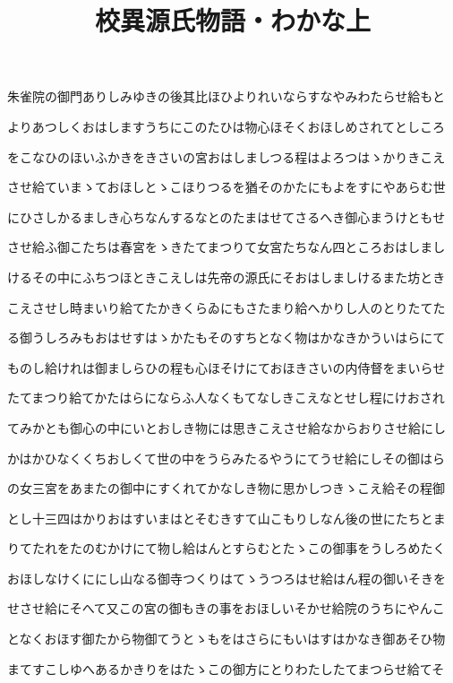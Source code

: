 \documentclass[a4paper,11pt,landscape]{ltjtarticle}
\title{校異源氏物語・わかな上}
\date{}
\begin{document}
\maketitle

朱雀院の御門ありしみゆきの後其比ほひよりれいならすなやみわたらせ給もと
\par\medskip
よりあつしくおはしますうちにこのたひは物心ほそくおほしめされてとしころ
\par\medskip
をこなひのほいふかきをきさいの宮おはしましつる程はよろつはゝかりきこえ
\par\medskip
させ給ていまゝておほしとゝこほりつるを猶そのかたにもよをすにやあらむ世
\par\medskip
にひさしかるましき心ちなんするなとのたまはせてさるへき御心まうけともせ
\par\medskip
させ給ふ御こたちは春宮をゝきたてまつりて女宮たちなん四ところおはしまし
\par\medskip
けるその中にふちつほときこえしは先帝の源氏にそおはしましけるまた坊とき
\par\medskip
こえさせし時まいり給てたかきくらゐにもさたまり給へかりし人のとりたてた
\par\medskip
る御うしろみもおはせすはゝかたもそのすちとなく物はかなきかういはらにて
\par\medskip
ものし給けれは御ましらひの程も心ほそけにておほきさいの内侍督をまいらせ
\par\medskip
たてまつり給てかたはらにならふ人なくもてなしきこえなとせし程にけおされ
\par\medskip
てみかとも御心の中にいとおしき物には思きこえさせ給なからおりさせ給にし
\par\medskip
かはかひなくくちおしくて世の中をうらみたるやうにてうせ給にしその御はら
\par\medskip
の女三宮をあまたの御中にすくれてかなしき物に思かしつきゝこえ給その程御
\par\medskip
とし十三四はかりおはすいまはとそむきすて山こもりしなん後の世にたちとま
\par\medskip
りてたれをたのむかけにて物し給はんとすらむとたゝこの御事をうしろめたく
\par\medskip
おほしなけくににし山なる御寺つくりはてゝうつろはせ給はん程の御いそきを
\par\medskip
せさせ給にそへて又この宮の御もきの事をおほしいそかせ給院のうちにやんこ
\par\medskip
となくおほす御たから物御てうとゝもをはさらにもいはすはかなき御あそひ物
\par\medskip
まてすこしゆへあるかきりをはたゝこの御方にとりわたしたてまつらせ給てそ
\end{document}
